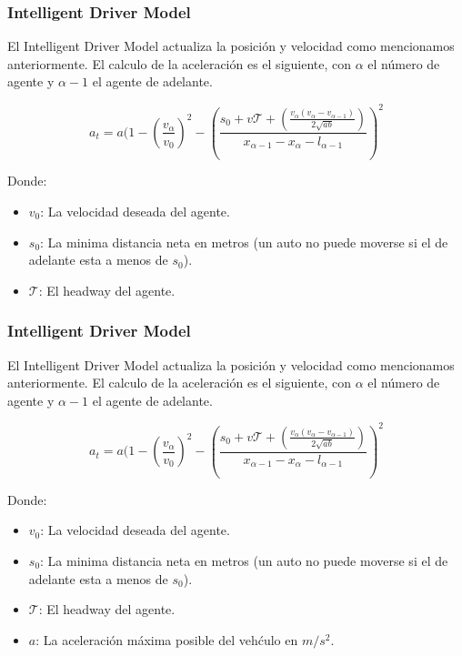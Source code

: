 \documentclass[10pt, compress]{beamer}
\begin{document}
\begin{frame}[fragile]

\frametitle{Intelligent Driver Model}
El Intelligent Driver Model actualiza la posici\'on y velocidad como mencionamos anteriormente. El calculo de la aceleraci\'on es el siguiente, con $\alpha$ el n\'umero de agente y $\alpha - 1$ el agente de adelante.

  \begin{equation*}
    a_t = a (1 - (\frac{v_\alpha}{v_0})^2 - (\frac{s_0 + v\mathcal{T} + (\frac{v_\alpha (v_\alpha - v_{\alpha-1})}{2\sqrt{ab}})}{x_{\alpha-1} - x_\alpha - l_{\alpha-1}})^2
  \end{equation*}

Donde:
\begin{itemize}
\item $v_0$: La velocidad deseada del agente.
\item $s_0$: La minima distancia neta en metros (un auto no puede moverse si el de adelante esta a menos de $s_0$).
\item $\mathcal{T}$: El headway del agente.
\end{itemize}
\addtocounter{framenumber}{-1}
\end{frame}

\begin{frame}[fragile]

\frametitle{Intelligent Driver Model}
El Intelligent Driver Model actualiza la posici\'on y velocidad como mencionamos anteriormente. El calculo de la aceleraci\'on es el siguiente, con $\alpha$ el n\'umero de agente y $\alpha - 1$ el agente de adelante.

  \begin{equation*}
    a_t = a (1 - (\frac{v_\alpha}{v_0})^2 - (\frac{s_0 + v\mathcal{T} + (\frac{v_\alpha (v_\alpha - v_{\alpha-1})}{2\sqrt{ab}})}{x_{\alpha-1} - x_\alpha - l_{\alpha-1}})^2
  \end{equation*}

Donde:
\begin{itemize}
\item $v_0$: La velocidad deseada del agente.
\item $s_0$: La minima distancia neta en metros (un auto no puede moverse si el de adelante esta a menos de $s_0$).
\item $\mathcal{T}$: El headway del agente.
\item $a$: La aceleraci\'on m\'axima posible del veh\'culo en $m/s^2$.
\end{itemize}
\addtocounter{framenumber}{-1}
\end{frame}
\end{document}
